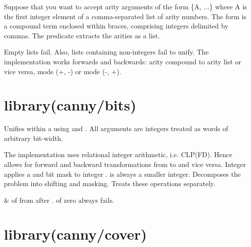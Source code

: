 \begin{description}
Suppose that you want to accept arity arguments of the form \{A, ...\}
where A is the first integer element of a comma-separated list of
arity numbers. The  form is a compound term enclosed within
braces, comprising integers delimited by commas. The 
predicate extracts the arities as a list.

Empty lists fail. Also, lists containing non-integers fail to unify.
The implementation works forwards and backwards: arity compound to
arity list or vice versa, mode (+, -) or mode (-, +).
\end{description}

\chapter{library(canny/bits)}\label{sec:bits}

\begin{description}
Unifies  within a  using  and . All arguments are
integers treated as words of arbitrary bit-width.

The implementation uses relational integer arithmetic, i.e. CLP(FD).
Hence allows for forward and backward transformations from  to
 and vice versa. Integer  applies a  and bit  mask
to integer .  is always a smaller integer. Decomposes the
problem into shifting and masking. Treats these operations
separately.

\begin{arguments}
 & of  from  after .  of zero always
fails. \\
\end{arguments}
\end{description}

\chapter{library(canny/cover)}\label{sec:cover}

